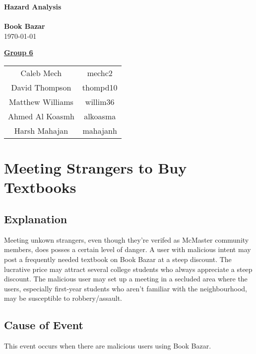 \documentclass[fullpage]{article}
\begin{document}
\vspace*{\fill}
\begin{center}

  {\Huge \textbf{Hazard Analysis}}\\
\hrulefill\\[2mm]
  {\huge \textbf{Book Bazar}}\\[2mm]
{\large \today}\\[15mm]
{\large
\underline{\textbf{Group 6}}\\
\begin{tabular}{ c c }

 Caleb Mech & mechc2\\ 
 David Thompson & thompd10\\
 Matthew Williams & willim36\\
 Ahmed Al Koasmh & alkoasma\\
 Harsh Mahajan	& mahajanh    
\end{tabular}
}

\end{center}

\vspace*{\fill}

\newpage
\begingroup
\hypersetup{hidelinks}
\tableofcontents

\endgroup
\newpage

\section{Meeting Strangers to Buy Textbooks}
\subsection*{Explanation}
Meeting unkown strangers, even though they're verifed as McMaster community members, does posses a certain level of danger. A user with malicious intent may post a frequently needed textbook on Book Bazar at a steep discount. The lucrative price may attract several college students who always appreciate a steep discount. The malicious user may set up a meeting in a secluded area where the users, especially first-year students who aren't familiar with the neighbourhood, may be susceptible to robbery/assault.

\subsection*{Cause of Event}
This event occurs when there are malicious users using Book Bazar.
\end{document}
